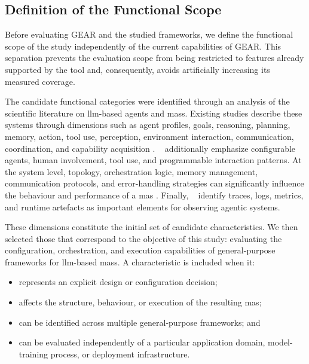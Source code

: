 \subsection{Definition of the Functional Scope}
\label{subsec:functional-scope}

Before evaluating GEAR and the studied frameworks, we define the functional
scope of the study independently of the current capabilities of GEAR. This
separation prevents the evaluation scope from being restricted to features
already supported by the tool and, consequently, avoids artificially
increasing its measured coverage.

The candidate functional categories were identified through an analysis of
the scientific literature on \gls{llm}-based agents and \gls{mas}s.
Existing studies describe these systems through dimensions such as agent
profiles, goals, reasoning, planning, memory, action, tool use, perception,
environment interaction, communication, coordination, and capability
acquisition \cite{xi2025rise,guo2024large}. ~\cite{wu2024autogen}
additionally emphasize configurable agents, human involvement, tool use, and
programmable interaction patterns. At the system level, topology,
orchestration logic, memory management, communication protocols, and
error-handling strategies can significantly influence the behaviour and
performance of a \gls{mas} \cite{emde2026maseval}. Finally,
~\cite{dong2024agentops} identify traces, logs, metrics, and runtime
artefacts as important elements for observing agentic systems.

These dimensions constitute the initial set of candidate characteristics. We
then selected those that correspond to the objective of this study: evaluating
the configuration, orchestration, and execution capabilities of
general-purpose frameworks for \gls{llm}-based \gls{mas}s. A
characteristic is included when it:

\begin{itemize}
    \item represents an explicit design or configuration decision;
    \item affects the structure, behaviour, or execution of the resulting
    \gls{mas};
    \item can be identified across multiple general-purpose frameworks; and
    \item can be evaluated independently of a particular application domain,
    model-training process, or deployment infrastructure.
\end{itemize}

